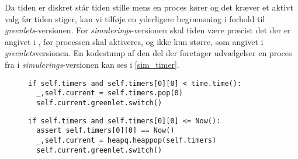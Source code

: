 Da tiden er diskret står tiden stille mens en proces kører og det kræver et aktivt valg før tiden stiger, kan vi tilføje en yderligere begrænsning i forhold til \emph{greenlets}-versionen. For \emph{simulerings}-versionen skal tiden være præcist det der er angivet i , før processen skal aktiveres, og ikke kun større, som angivet i \emph{greenlets}versionen. En kodestump af den del der foretager udvælgelser en proces fra  i \emph{simulerings}-versionen  kan ses i \cref{sim_timer}.

\begin{figure}[hbtp]
\begin{minipage}[c]{\linewidth}
\begin{lstlisting}[firstnumber=204, label=sched_timer, caption=Udvælgelse af proces fra listen timers (fra scheduling.py)]
if self.timers and self.timers[0][0] < time.time():
  _,self.current = self.timers.pop(0)
  self.current.greenlet.switch()
\end{lstlisting}
\end{minipage}
\begin{minipage}[c]{\linewidth}
\begin{lstlisting}[firstnumber=124, label=sim_timer, caption=Udvælgelse af proces fra listen timers (fra simulation.py)]
if self.timers and self.timers[0][0] <= Now():
  assert self.timers[0][0] == Now()
  _,self.current = heapq.heappop(self.timers)
  self.current.greenlet.switch()
\end{lstlisting}
\end{minipage}
\end{figure}

